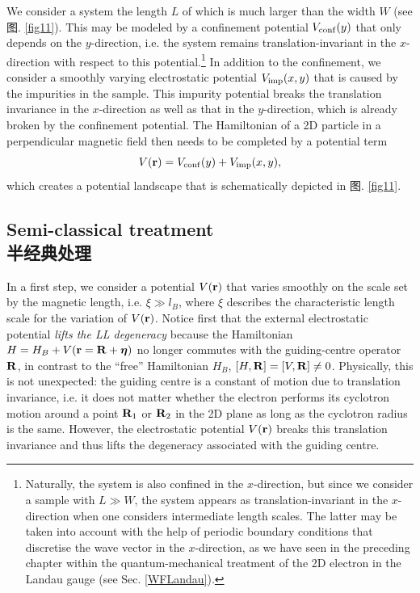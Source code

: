 \documentclass[10pt]{book}
\newcommand{\etab}{\mbox{\boldmath $\eta $}}
\newcommand{\br}{{\bf r}}
\newcommand{\bR}{{\bf R}}
\newcommand{\beq}{\begin{equation}}
\newcommand{\eeq}{\end{equation}}
\begin{document}
We consider a system the length $L$ of which is much larger than the width $W$ (see 图. \ref{fig11}). This may be modeled by 
a confinement potential $V_{\rm conf}(y)$ that only depends on the $y$-direction, i.e. the system remains translation-invariant
in the $x$-direction with respect to this potential.\footnote{Naturally, the system is also confined in the $x$-direction, but
since we consider a sample with $L\gg W$, the system appears as translation-invariant in the $x$-direction when one considers
intermediate length scales. The latter may be taken into account with the help of periodic boundary conditions that
discretise the wave vector in the $x$-direction, as we have seen in the preceding chapter within the quantum-mechanical treatment
of the 2D electron in the Landau gauge (see Sec. \ref{WFLandau}).} 
In addition to the confinement, we consider a smoothly varying electrostatic
potential $V_{\rm imp}(x,y)$ that is caused by the impurities in the sample. This impurity potential breaks the translation invariance
in the $x$-direction as well as that in the $y$-direction, which is already broken by the confinement potential. The Hamiltonian
of a 2D particle in a perpendicular magnetic field then needs to be completed by a potential term
\beq\label{extPot}
V(\br) = V_{\rm conf}(y) + V_{\rm imp}(x,y),
\eeq
which creates a potential landscape that is schematically depicted in 图. \ref{fig11}.

\subsection[半经典处理]{Semi-classical treatment\\\bf 半经典处理}

In a first step, we consider a potential $V(\br)$ that varies smoothly on the scale set by the magnetic length, i.e. 
$\xi\gg l_B$, where $\xi$ describes the characteristic length scale for the variation of $V(\br)$.
Notice first that the external
electrostatic potential {\sl lifts the LL degeneracy} because the Hamiltonian $H=H_B+V(\br=\bR +\etab)$ no longer commutes 
with the guiding-centre operator $\bR$, in contrast to the ``free'' Hamiltonian $H_B$, $[H,\bR]=[V,\bR]\neq 0$.
Physically, this is not unexpected: the guiding centre is a constant of motion due to translation invariance, i.e. it does
not matter whether the electron performs its cyclotron motion around a point $\bR_1$ or $\bR_2$ in the 2D plane as long as 
the cyclotron radius is the same. However, the electrostatic potential $V(\br)$ breaks this translation invariance
and thus lifts the degeneracy associated with the guiding centre.
\end{document}
